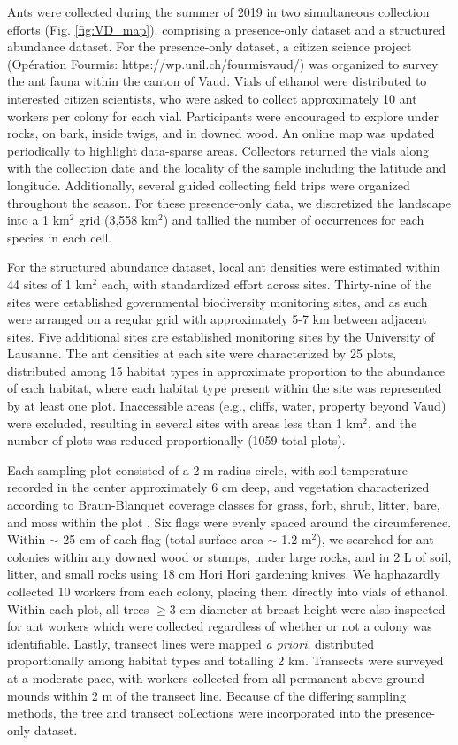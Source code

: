 \documentclass[preprint,review,times,12pt,3p]{elsarticle}
\begin{document}
Ants were collected during the summer of 2019 in two simultaneous collection efforts (Fig. \ref{fig:VD_map}), comprising a presence-only dataset and a structured abundance dataset. For the presence-only dataset, a citizen science project (Opération Fourmis: https://wp.unil.ch/fourmisvaud/) was organized to survey the ant fauna within the canton of Vaud. Vials of ethanol were distributed to interested citizen scientists, who were asked to collect approximately 10 ant workers per colony for each vial. Participants were encouraged to explore under rocks, on bark, inside twigs, and in downed wood. An online map was updated periodically to highlight data-sparse areas. Collectors returned the vials along with the collection date and the locality of the sample including the latitude and longitude. Additionally, several guided collecting field trips were organized throughout the season. For these presence-only data, we discretized the landscape into a 1 km$^2$ grid (3,558 km$^2$) and tallied the number of occurrences for each species in each cell. 

For the structured abundance dataset, local ant densities were estimated within 44 sites of 1 km$^2$ each, with standardized effort across sites. Thirty-nine of the sites were established governmental biodiversity monitoring sites, and as such were arranged on a regular grid with approximately 5-7 km between adjacent sites. Five additional sites are established monitoring sites by the University of Lausanne. The ant densities at each site were characterized by 25 plots, distributed among 15 habitat types \citep{Gago-Silva2017} in approximate proportion to the abundance of each habitat, where each habitat type present within the site was represented by at least one plot. Inaccessible areas (e.g., cliffs, water, property beyond Vaud) were excluded, resulting in several sites with areas less than 1 km$^2$, and the number of plots was reduced proportionally (1059 total plots). 

Each sampling plot consisted of a 2 m radius circle, with soil temperature recorded in the center approximately 6 cm deep, and vegetation characterized according to Braun-Blanquet coverage classes for grass, forb, shrub, litter, bare, and moss within the plot \citep{Douglas1978}. Six flags were evenly spaced around the circumference. Within $\sim$ 25 cm of each flag (total surface area $\sim$ 1.2 m$^2$), we searched for ant colonies within any downed wood or stumps, under large rocks, and in 2 L of soil, litter, and small rocks using 18 cm Hori Hori gardening knives. We haphazardly collected 10 workers from each colony, placing them directly into vials of ethanol. Within each plot, all trees $\geq$3 cm diameter at breast height were also inspected for ant workers which were collected regardless of whether or not a colony was identifiable. Lastly, transect lines were mapped \emph{a priori}, distributed proportionally among habitat types and totalling 2 km. Transects were surveyed at a moderate pace, with workers collected from all permanent above-ground mounds within 2 m of the transect line. Because of the differing sampling methods, the tree and transect collections were incorporated into the presence-only dataset. 
\end{document}
